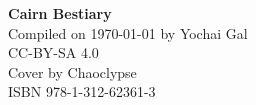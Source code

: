 \documentclass[
  10pt,
  american,
  openany
]{extbook}
\begin{document}
\setcounter{page}{1} %
\thispagestyle{plain} %

\vspace*{\fill} %
\begin{center}
    {\LARGE \bfseries Cairn Bestiary} \\[10pt]
    {\large Compiled on {\today} by Yochai Gal} \\[5pt]
    {\large CC-BY-SA 4.0} \\[5pt]
    {\large Cover by Chaoclypse} \\[10pt]
    {\large ISBN 978-1-312-62361-3}
\end{center}
\vspace*{\fill} %

\clearpage
\pagestyle{fancy} %
\fancyhf{} 
\fancyfoot[C]{\thepage} %

\let\oldtoc\tableofcontents
\renewcommand{\contentsname}{\centering Creatures from A to Z}
\renewcommand{\tableofcontents}{\oldtoc\newpage}
{
\pagestyle{plain}
\begin{multicols}{2}
\tableofcontents
\end{multicols}
}
\clearpage
{}

\end{document}
